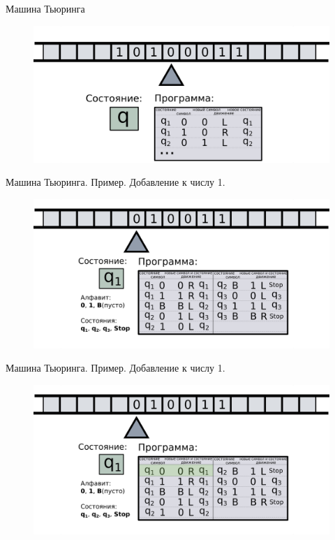 \documentclass[10pt]{beamer}
\begin{document}
\begin{frame}{Машина Тьюринга}
	\begin{figure}
		\centerline{\includegraphics[width=1.5\linewidth]{images/tm_4.png}}
	\end{figure}
\end{frame}




\begin{frame}{Машина Тьюринга. Пример. Добавление к числу 1.}
	\begin{figure}
		\centerline{\includegraphics[width=1.5\linewidth]{images/tm_ex_1.png}}
	\end{figure}
\end{frame}

\begin{frame}{Машина Тьюринга. Пример. Добавление к числу 1.}
	\begin{figure}
		\centerline{\includegraphics[width=1.5\linewidth]{images/tm_ex_2.png}}
	\end{figure}
\end{frame}
\end{document}
